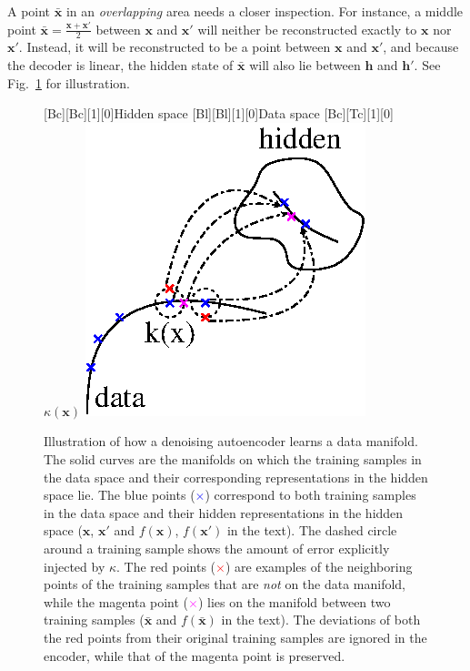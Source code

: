 \documentclass{now}
\newcommand{\vect}[1]{\mathbf{#1}}
\newcommand{\vh}[0]{\vect{h}}
\newcommand{\vx}[0]{\vect{x}}
\begin{document}
A point $\bar{\vx}$ in an \textit{overlapping} area needs a closer inspection.
For instance, a middle point $\bar{\vx} = \frac{\vx + \vx'}{2}$ between $\vx$
and $\vx'$ will neither be reconstructed exactly to $\vx$ nor $\vx'$.  Instead,
it will be reconstructed to be a point between $\vx$ and $\vx'$, and because the
decoder is linear, the hidden state of $\bar{\vx}$ will also lie between $\vh$
and $\vh'$. See Fig.~\ref{fig:dae_manifold} for illustration.

\begin{figure}[t]
    \centering
    [Bc][Bc][1][0]{Hidden space}
    [Bl][Bl][1][0]{Data space}
    [Bc][Tc][1][0]{$\kappa(\vx)$}
    \includegraphics[width=0.75\columnwidth]{../figures/dae.eps}
    \caption{Illustration of how a denoising autoencoder learns a data manifold.
        The solid curves are the manifolds on which the training samples in the
        data space and their corresponding representations in the hidden space
        lie.  The blue points (\textcolor{blue}{$\times$}) correspond to both
        training samples in the data space and their hidden representations in
        the hidden space ($\vx$, $\vx'$ and $f(\vx)$, $f(\vx')$ in the text).
        The dashed circle around a training sample shows the amount of error
        explicitly injected by $\kappa$. The red points
        (\textcolor{red}{$\times$}) are examples of the neighboring points of
        the training samples that are \textit{not} on the data manifold, while
        the magenta point (\textcolor{magenta}{$\times$}) lies on the manifold
        between two training samples ($\bar{\vx}$ and $f(\bar{\vx})$ in the
        text). The deviations of both the red points from their original
        training samples are ignored in the encoder, while that of the magenta
        point is preserved.
    }
    \label{fig:dae_manifold}
\end{figure}
\end{document}
